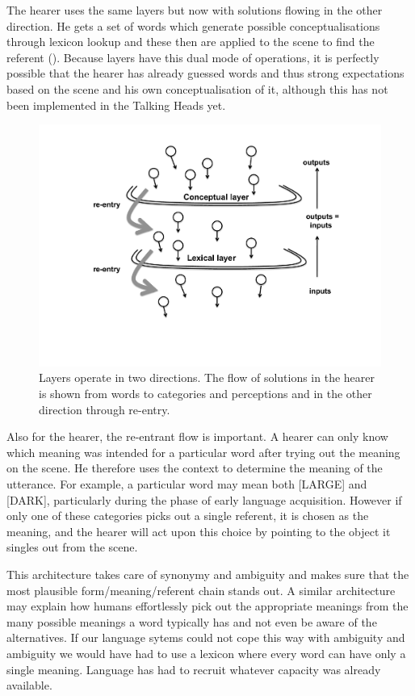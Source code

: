 The hearer uses the same layers but now with solutions
flowing in the other direction. He gets a set of words
which generate possible conceptualisations through 
lexicon lookup and these then are applied to the 
scene to find the referent (). Because 
layers have this dual mode of operations, it is perfectly 
possible that the hearer has already guessed words and 
thus strong expectations based on the scene and his 
own conceptualisation of it, although this has not been
implemented in the Talking Heads yet. 


\begin{figure}[htbp]
  \centerline{\includegraphics[width=.65\textwidth]{chap6/figs/sieve2b.pdf}}
\caption{\label{sieve2b}Layers operate in two 
directions. The flow of solutions in the hearer is shown from words to categories and perceptions
and in the other direction through re-entry.}
\end{figure}

Also for the hearer, the re-entrant flow is important. 
A hearer can only know which meaning was intended for a particular
word after trying out the meaning on the scene. He
therefore uses the context to determine the meaning of 
the utterance. For example, a particular word may mean both [LARGE]
and [DARK], particularly during the phase of 
early language acquisition. However if only one of these categories
picks out a single referent, it is chosen as 
the meaning, and the hearer will act upon this choice by 
pointing to the object it singles out from the scene. 

This architecture takes care of synonymy and ambiguity and
makes sure that the most plausible form/meaning/referent
chain stands out. A similar architecture may explain how
humans effortlessly pick out the appropriate meanings from 
the many possible meanings a word typically has and not even 
be aware of the alternatives. If our language sytems 
could not cope this way with ambiguity and ambiguity we 
would have had to use a lexicon where every word can 
have only a single meaning. Language has had to 
recruit whatever capacity was already available. 

